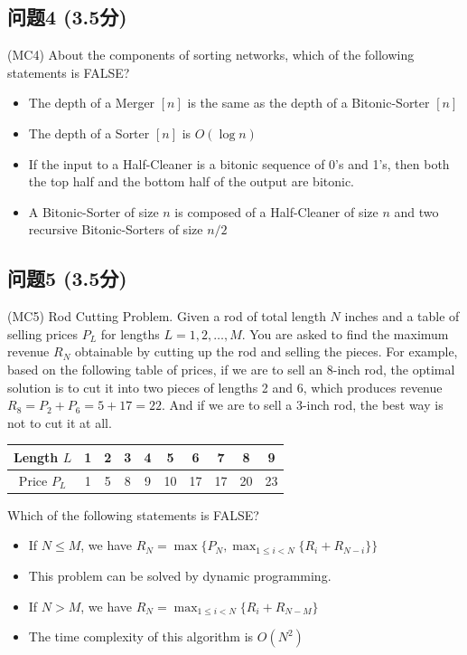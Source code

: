 \documentclass[11pt, a4paper]{article}
\begin{document}
\subsection*{问题4 (3.5分)}
(MC4) About the components of sorting networks, which of the following statements is FALSE?

\begin{itemize}
    \item The depth of a Merger \([n]\) is the same as the depth of a Bitonic-Sorter \([n]\)
    \item The depth of a Sorter \([n]\) is \(O(\log n)\)
    \item If the input to a Half-Cleaner is a bitonic sequence of 0's and 1's, then both the top half and the bottom half of the output are bitonic.
    \item A Bitonic-Sorter of size \(n\) is composed of a Half-Cleaner of size \(n\) and two recursive Bitonic-Sorters of size \(n/2\)
\end{itemize}

\subsection*{问题5 (3.5分)}
(MC5) Rod Cutting Problem. Given a rod of total length \(N\) inches and a table of selling prices \(P_L\) for lengths \(L = 1, 2, \ldots, M\). You are asked to find the maximum revenue \(R_N\) obtainable by cutting up the rod and selling the pieces. For example, based on the following table of prices, if we are to sell an 8-inch rod, the optimal solution is to cut it into two pieces of lengths 2 and 6, which produces revenue \(R_8 = P_2 + P_6 = 5 + 17 = 22\). And if we are to sell a 3-inch rod, the best way is not to cut it at all.

\begin{center}
\begin{tabular}{c|ccccccccc}
Length \(L\) & 1 & 2 & 3 & 4 & 5 & 6 & 7 & 8 & 9 \\
\hline
Price \(P_L\) & 1 & 5 & 8 & 9 & 10 & 17 & 17 & 20 & 23
\end{tabular}
\end{center}

Which of the following statements is FALSE?

\begin{itemize}
    \item If \(N \leq M\), we have \(R_N = \max \{P_N, \max_{1 \leq i < N} \{R_i + R_{N-i}\} \}\)
    \item This problem can be solved by dynamic programming.
    \item If \(N > M\), we have \(R_N = \max_{1 \leq i < N} \{R_i + R_{N-M}\}\)
    \item The time complexity of this algorithm is \(O(N^2)\)
\end{itemize}
\end{document}
